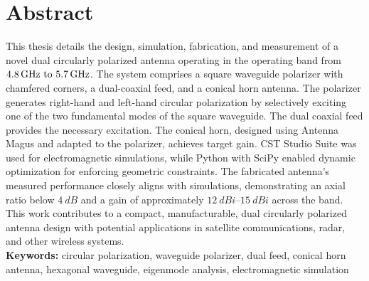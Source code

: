 \clearpage
\chapter*{Abstract}
This thesis details the design, simulation, fabrication, and measurement of a novel dual circularly polarized antenna operating in the operating band from $\frequencyrange$. The system comprises a square waveguide polarizer with chamfered corners, a dual-coaxial feed, and a conical horn antenna. The polarizer generates right-hand and left-hand circular polarization by selectively exciting one of the two fundamental modes of the square waveguide. The dual coaxial feed provides the necessary excitation. The conical horn, designed using Antenna Magus and adapted to the polarizer, achieves target gain. CST Studio Suite was used for electromagnetic simulations, while Python with SciPy enabled dynamic optimization for enforcing geometric constraints. The fabricated antenna's measured performance closely aligns with simulations, demonstrating an axial ratio below $\qty{4}{dB}$ and a gain of approximately $\qtyrange{12}{15}{dBi}$ across the band. This work contributes to a compact, manufacturable, dual circularly polarized antenna design with potential applications in satellite communications, radar, and other wireless systems.\\[0.25cm]
\textbf{Keywords:} circular polarization, waveguide polarizer, dual feed, conical horn antenna, hexagonal waveguide, eigenmode analysis, electromagnetic simulation
\clearpage